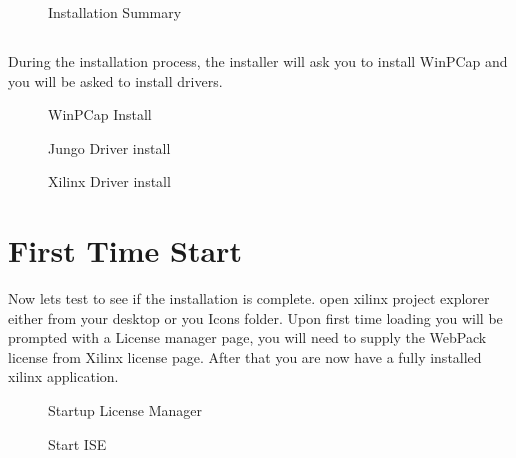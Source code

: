 \documentclass[letter]{article}
\begin{document}
\begin{figure}[!htbp]
  \centering
  \caption{Installation Summary}
\end{figure}

\subsection{}
During the installation process, the installer will ask you to install WinPCap and you will be asked to install drivers. 

\begin{figure}[!htbp]
  \centering
  \caption{WinPCap Install}
\end{figure}

\begin{figure}[!htbp]
  \centering
  \caption{Jungo Driver install}
\end{figure}

\begin{figure}[!htbp]
  \centering
  \caption{Xilinx Driver install}
\end{figure}

\newpage

\section{First Time Start}
Now lets test to see if the installation is complete. open xilinx project explorer either from your desktop or you Icons folder. Upon first time loading you will be prompted with a License manager page, you will need to supply the WebPack license from Xilinx license page. After that you are now have a fully installed xilinx application.

\begin{figure}[!htbp]
  \centering
  \caption{Startup License Manager}
\end{figure}

\begin{figure}[!htbp]
  \centering
  \caption{Start ISE}
\end{figure}
\end{document}
